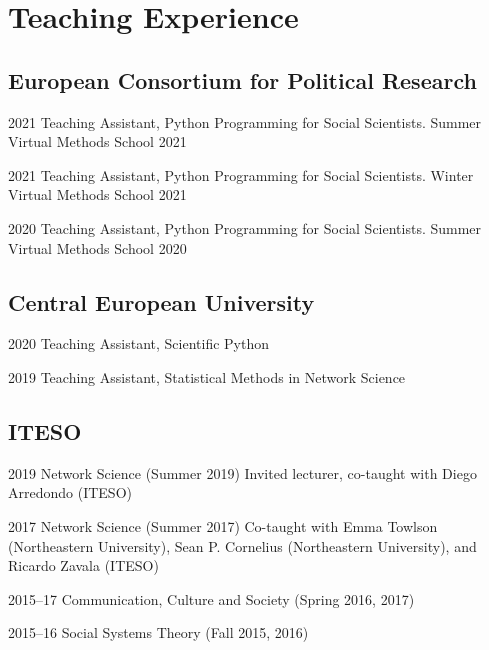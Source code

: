 \documentclass{academiccv}
\begin{document}
\section*{Teaching Experience}

\subsection*{European Consortium for Political Research}
\begin{tablist}
	\item[2021] \tab Teaching Assistant, Python Programming for Social Scientists. Summer Virtual Methods School 2021
	\item[2021] \tab Teaching Assistant, Python Programming for Social Scientists. Winter Virtual Methods School 2021
	\item[2020] \tab Teaching Assistant, Python Programming for Social Scientists. Summer Virtual Methods School 2020
\end{tablist}

\subsection*{Central European University}
\begin{tablist}
	\item[2020] \tab Teaching Assistant, Scientific Python
	\item[2019] \tab Teaching Assistant, Statistical Methods in Network Science
\end{tablist}

\subsection*{ITESO}
\begin{tablist}
	\item[2019] \tab Network Science (Summer 2019) Invited lecturer, co-taught with Diego Arredondo (ITESO)
	\item[2017]	\tab Network Science (Summer 2017) Co-taught with Emma Towlson (Northeastern University), Sean P. Cornelius (Northeastern University), and Ricardo Zavala (ITESO)
	\item [2015--17]\tab Communication, Culture and Society (Spring 2016, 2017)
	\item [2015--16]\tab Social Systems Theory (Fall 2015, 2016)
\end{tablist} 
\end{document}

